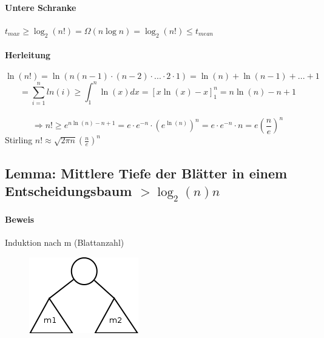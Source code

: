 \vspace{30pt}
\paragraph{Untere Schranke}
$t_{max} \geq \log_2(n!) = \Omega(n \log n) =  \log_2(n!) \leq t_{mean}$
\vspace{90pt}


\paragraph{Herleitung}
\[ \ln(n!) = \ln(n(n-1) \cdot (n-2) \cdot ... \cdot 2 \cdot 1) = \ln(n)+\ln(n-1)+...+1\]
\[ = \sum^{n}_{i=1} ln(i) \geq \int_1^n \ln(x) dx = \left[x\ln(x)-x \right]_1^{n} = n\ln(n)-n+1\]\\
\[\Rightarrow n! \geq e^{n\ln(n)-n+1} = e \cdot e^{-n} \cdot \left(e^{\ln(n)}\right)^n = e \cdot e^{-n} \cdot n = e\left(\frac{n}{e}\right)^n \] 
Stirling $n! \approx \sqrt{2 \pi n} (\frac{n}{e})^n$

\newpage

\subsection{Lemma: Mittlere Tiefe der Blätter in einem Entscheidungsbaum $> \log_2(n)n$}

\paragraph{Beweis} Induktion nach m (Blattanzahl)

\begin{figure}
\vspace{-50pt}
\includegraphics[width=\linewidth]{09/Grafik/img2.png}
\caption{}
\end{figure}

